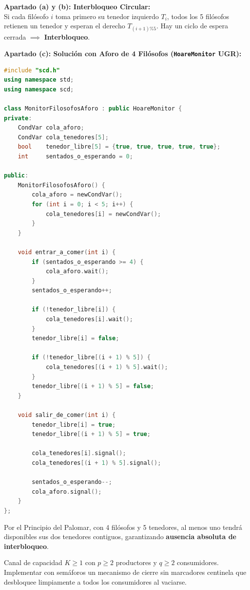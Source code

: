 \begin{solucion}
\textbf{Apartado (a) y (b): Interbloqueo Circular:}\\
Si cada filósofo $i$ toma primero su tenedor izquierdo $T_i$, todos los 5 filósofos retienen un tenedor y esperan el derecho $T_{(i+1)\%5}$. Hay un ciclo de espera cerrada $\implies$ \textbf{Interbloqueo}.

\textbf{Apartado (c): Solución con Aforo de 4 Filósofos (\texttt{HoareMonitor} UGR):}
\begin{lstlisting}[language=C++]
#include "scd.h"
using namespace std;
using namespace scd;

class MonitorFilosofosAforo : public HoareMonitor {
private:
    CondVar cola_aforo;
    CondVar cola_tenedores[5];
    bool    tenedor_libre[5] = {true, true, true, true, true};
    int     sentados_o_esperando = 0;

public:
    MonitorFilosofosAforo() {
        cola_aforo = newCondVar();
        for (int i = 0; i < 5; i++) {
            cola_tenedores[i] = newCondVar();
        }
    }

    void entrar_a_comer(int i) {
        if (sentados_o_esperando >= 4) {
            cola_aforo.wait();
        }
        sentados_o_esperando++;

        if (!tenedor_libre[i]) {
            cola_tenedores[i].wait();
        }
        tenedor_libre[i] = false;

        if (!tenedor_libre[(i + 1) % 5]) {
            cola_tenedores[(i + 1) % 5].wait();
        }
        tenedor_libre[(i + 1) % 5] = false;
    }

    void salir_de_comer(int i) {
        tenedor_libre[i] = true;
        tenedor_libre[(i + 1) % 5] = true;
        
        cola_tenedores[i].signal();
        cola_tenedores[(i + 1) % 5].signal();

        sentados_o_esperando--;
        cola_aforo.signal();
    }
};
\end{lstlisting}
Por el Principio del Palomar, con 4 filósofos y 5 tenedores, al menos uno tendrá disponibles sus dos tenedores contiguos, garantizando \textbf{ausencia absoluta de interbloqueo}.
\end{solucion}

\begin{ejercicio}
Canal de capacidad $K \ge 1$ con $p \ge 2$ productores y $q \ge 2$ consumidores. Implementar con semáforos un mecanismo de cierre sin marcadores centinela que desbloquee limpiamente a todos los consumidores al vaciarse.
\end{ejercicio}

